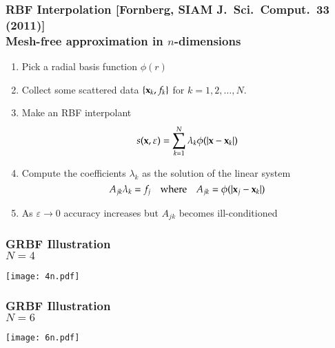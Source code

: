 \begin{frame}
\frametitle{RBF Interpolation {\large[Fornberg, SIAM J.~Sci.~Comput.~33 (2011)]}\\
\textcolor{egg}{\large Mesh-free approximation in $n$-dimensions}}

\begin{enumerate}
\item<1-> Pick a radial basis function $\phi(r)$
\item<2-> Collect some scattered data $\{\mathbf{x}_k,f_k\}$ for $k=1,2,\ldots,N$.
\item<3-> Make an RBF interpolant
  \begin{equation*}
    s(\mathbf{x},\varepsilon) = \sum_{k=1}^N \lambda_k \phi(|\mathbf{x}-\mathbf{x}_k|)
  \end{equation*}
\item<4-> Compute the coefficients $\lambda_k$ as the solution of the linear system
  \begin{equation*}
    A_{jk} \lambda_k = f_j \quad\mbox{where}\quad A_{jk} = \phi(|\mathbf{x}_j-\mathbf{x}_k|)
  \end{equation*}
\item<5-> As $\varepsilon \rightarrow 0$ accuracy increases but $A_{jk}$ becomes \alert{ill-conditioned}
\end{enumerate}

\end{frame}
\newcommand\cwid{14cm}
\begin{frame}
\frametitle{GRBF Illustration\\
\textcolor{egg}{\large $N=4$}}
\begin{center}
  \vspace{-3mm}
\texttt{[image: 4n.pdf]}
\end{center}
\end{frame}
\begin{frame}
\frametitle{GRBF Illustration\\
\textcolor{egg}{\large $N=6$}}
\vskip -5mm
\begin{center}
  \vspace{-3mm}
\texttt{[image: 6n.pdf]}
\end{center}
\end{frame}
